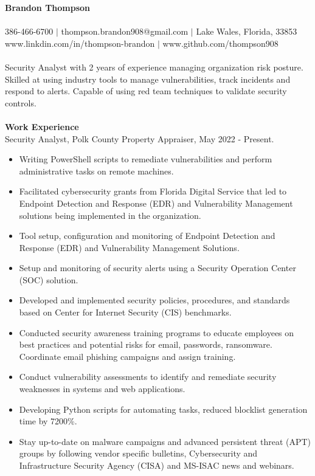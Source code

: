 \documentclass[12pt,a4paper]{article}
\begin{document}
{\centering\textbf{Brandon Thompson}}\\
\\
386-466-6700 $|$ thompson.brandon908@gmail.com $|$ Lake Wales, Florida, 33853\\ %
www.linkdin.com/in/thompson-brandon $|$ www.github.com/thompson908
\\
\\
Security Analyst with 2 years of experience managing organization risk posture. Skilled at using industry tools to manage vulnerabilities, track incidents and respond to alerts. Capable of using red team techniques to validate security controls.
\\
\\
\textbf{Work Experience}\\
Security Analyst, Polk County Property Appraiser, May 2022 - Present.
\begin{itemize}
    \item Writing PowerShell scripts to remediate vulnerabilities and perform administrative tasks on remote machines.  
    \item Facilitated cybersecurity grants from Florida Digital Service that led to Endpoint Detection and Response (EDR) and Vulnerability Management solutions being implemented in the organization. 
    \item Tool setup, configuration and monitoring of Endpoint Detection and Response (EDR) and Vulnerability Management Solutions.
    \item Setup and monitoring of security alerts using a Security Operation Center (SOC) solution.
    \item Developed and implemented security policies, procedures, and standards based on Center for Internet Security (CIS) benchmarks.
    \item Conducted security awareness training programs to educate employees on best practices and potential risks for email, passwords, ransomware. Coordinate email phishing campaigns and assign training.
    \item Conduct vulnerability assessments to identify and remediate security weaknesses in systems and web applications. %
    \item Developing Python scripts for automating tasks, reduced blocklist generation time by 7200\%.
    \item Stay up-to-date on malware campaigns and advanced persistent threat (APT) groups by following vendor specific bulletins, Cybersecurity and Infrastructure Security Agency (CISA) and MS-ISAC news and webinars.
\end{itemize}
\end{document}
